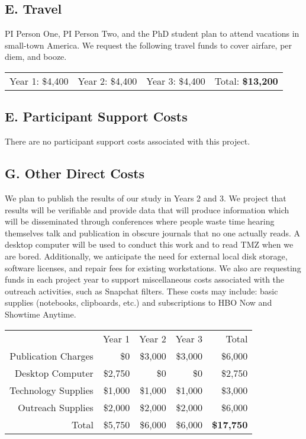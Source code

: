 \subsection*{E. Travel}
PI Person One, PI Person Two, and the PhD student plan to attend vacations in small-town America. We request the following travel funds to cover airfare, per diem, and booze.
\newline
\begin{table}[H]
\begin{tabular}[c]{cccc}
Year 1: \$4,400  & Year 2: \$4,400    & Year 3: \$4,400    & Total: \textbf{\$13,200}
\end{tabular}
\end{table}

\subsection*{E. Participant Support Costs}
There are no participant support costs associated with this project.

\subsection*{G. Other Direct Costs}
We plan to publish the results of our study in Years 2 and 3. We project that results will be verifiable and provide data that will produce information which will be disseminated through conferences where people waste time hearing themselves talk and publication in obscure journals that no one actually reads. A desktop computer will be used to conduct this work and to read TMZ when we are bored. Additionally, we anticipate the need for external local disk storage, software licenses, and repair fees for existing workstations. We also are requesting funds in each project year to support miscellaneous costs associated with the outreach activities, such as Snapchat filters.  These costs may include: basic supplies (notebooks, clipboards, etc.) and subscriptions to HBO Now and Showtime Anytime.
\newline
\begin{table}[H]
\begin{tabular}[c]{r r r r | r}
 & Year 1 & Year 2 & Year 3 & Total\\
Publication Charges     & \$0        & \$3,000    & \$3,000    & \$6,000\\
Desktop Computer        & \$2,750    & \$0        & \$0        & \$2,750\\
Technology Supplies     & \$1,000    & \$1,000    &\$1,000     & \$3,000\\
Outreach Supplies       & \$2,000    & \$2,000    &\$2,000     & \$6,000\\
\hline
Total                   & \$5,750   & \$6,000   & \$6,000 & \textbf{\$17,750}
\end{tabular}
\end{table}

